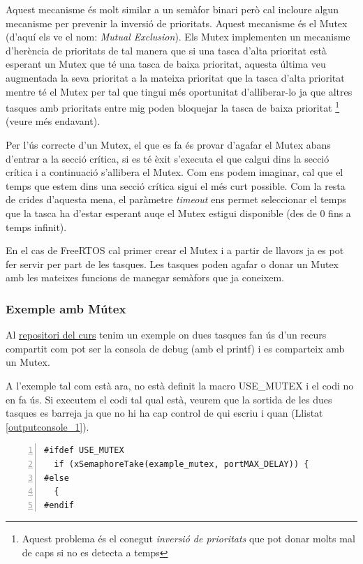 Aquest mecanisme és molt similar a un semàfor binari però cal incloure algun mecanisme per prevenir la inversió de prioritats. Aquest mecanisme és el Mutex (d'aquí els ve el nom: {\em Mutual Exclusion}). Els Mutex implementen un mecanisme d'herència de prioritats de tal manera que si una tasca d'alta prioritat està esperant un Mutex que té una tasca de baixa prioritat, aquesta última veu augmentada la seva prioritat a la mateixa prioritat que la tasca d'alta prioritat mentre té el Mutex per tal que tingui més oportunitat d'alliberar-lo ja que altres tasques amb prioritats entre mig poden bloquejar la tasca de baixa prioritat \footnote{Aquest problema és el conegut {\em inversió de prioritats} que pot donar molts mal de caps si no es detecta a temps} (veure  més endavant).

Per l'ús correcte d'un Mutex, el que es fa és provar d'agafar el Mutex abans d'entrar a la secció crítica, si es té èxit s'executa el que calgui dins la secció crítica i a continuació s'allibera el Mutex. Com ens podem imaginar, cal que el temps que estem dins una secció crítica sigui el més curt possible. Com la resta de crides d'aquesta mena, el paràmetre {\em timeout} ens permet seleccionar el temps que la tasca ha d'estar esperant auqe el Mutex estigui disponible (des de 0 fins a temps infinit).

En el cas de FreeRTOS cal primer crear el Mutex i a partir de llavors ja es pot fer servir per part de les tasques. Les tasques poden agafar o donar un Mutex amb les mateixes funcions de manegar semàfors que ja coneixem.



\subsubsection{Exemple amb Mútex}
\label{sub:mutex_exemple}
Al \href{https://github.com/mariusmm/cursembedded/tree/master/Simplicity/FreeRTOS_Mutex}{repositori del curs} tenim un exemple on dues tasques fan ús d'un recurs compartit com pot ser la consola de debug (amb el printf) i es comparteix amb un Mutex.

A l'exemple tal com està ara, no està definit la macro USE\_MUTEX i el codi no en fa ús. Si executem el codi tal qual està, veurem que la sortida de les dues tasques es barreja ja que no hi ha cap control de qui escriu i quan (Llistat \ref{outputconsole_1}).

\begin{lstlisting}[style=customc, numbers=left, caption=Exemple d'ús de macros en C, label=macro_example]
#ifdef USE_MUTEX
  if (xSemaphoreTake(example_mutex, portMAX_DELAY)) {
#else
  {
#endif
\end{lstlisting}

